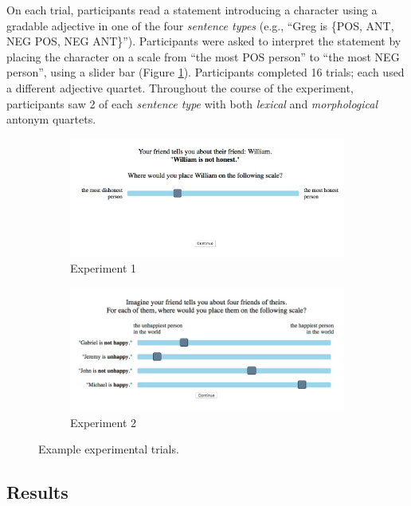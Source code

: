 \documentclass[10pt,letterpaper]{article}
\newcommand{\figref}[1]{Figure \ref{#1}}
\begin{document}
On each trial, participants read a statement introducing a character using a gradable adjective in one of the four \emph{sentence types} (e.g., ``Greg is \{POS, ANT, NEG POS, NEG ANT\}'').
Participants were asked to interpret the statement by placing the character on a scale from ``the most POS person'' to ``the most NEG person'', using a slider bar (\figref{fig:expt1}).
Participants completed 16 trials; each used a different adjective quartet.
Throughout the course of the experiment, participants saw 2 of each \emph{sentence type} with both \emph{lexical} and \emph{morphological} antonym quartets. 

\begin{figure}[t]
	\centering
	\begin{subfigure}[t]{0.5\textwidth}
		\centering
		\includegraphics[width=\textwidth]{expt1.jpeg}
		\caption{Experiment 1}\label{fig:expt1}		
	\end{subfigure}%
	\quad
	\begin{subfigure}[t]{0.5\textwidth}
		\centering
		\includegraphics[width=\textwidth]{expt2.jpeg}
		\caption{Experiment 2}\label{fig:expt2}
	\end{subfigure}
	\caption{Example experimental trials.}\label{fig:expt-procedure}
\end{figure}


\subsection{Results}
\end{document}
